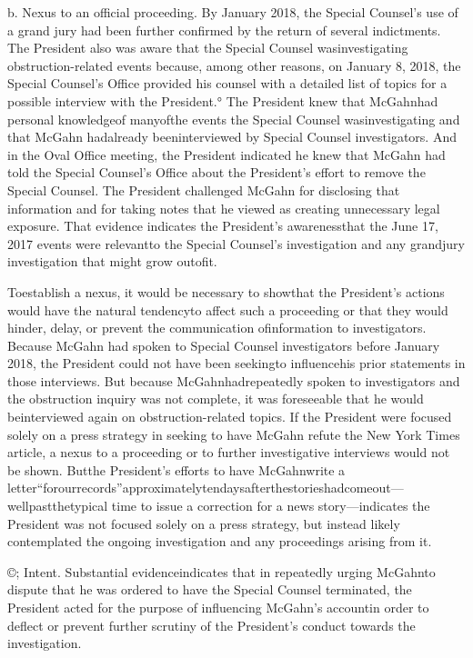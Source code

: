b. Nexus to an official proceeding. By January 2018, the Special Counsel’s use of a grand jury had been further confirmed by the return of several indictments. The President also was aware that the Special Counsel wasinvestigating obstruction-related events because, among other reasons, on January 8, 2018, the Special Counsel’s Office provided his counsel with a detailed list of topics for a possible interview with the President.° The President knew that McGahnhad personal knowledgeof manyofthe events the Special Counsel wasinvestigating and that McGahn hadalready beeninterviewed by Special Counsel investigators. And in the Oval Office meeting, the President indicated he knew that McGahn had told the Special Counsel’s Office about the President’s effort to remove the Special Counsel. The President challenged McGahn for disclosing that information and for taking notes that he viewed as creating unnecessary legal exposure. That evidence indicates the President’s awarenessthat the June 17, 2017 events were relevantto the Special Counsel’s investigation and any grandjury investigation that might grow outofit.

Toestablish a nexus, it would be necessary to showthat the President’s actions would have the natural tendencyto affect such a proceeding or that they would hinder, delay, or prevent the communication ofinformation to investigators. Because McGahn had spoken to Special Counsel investigators before January 2018, the President could not have been seekingto influencehis prior statements in those interviews. But because McGahnhadrepeatedly spoken to investigators and the obstruction inquiry was not complete, it was foreseeable that he would beinterviewed again on obstruction-related topics. If the President were focused solely on a press strategy in seeking to have McGahn refute the New York Times article, a nexus to a proceeding or to further investigative interviews would not be shown. Butthe President’s efforts to have McGahnwrite a letter“forourrecords”approximatelytendaysafterthestorieshadcomeout—wellpastthetypical time to issue a correction for a news story—indicates the President was not focused solely on a press strategy, but instead likely contemplated the ongoing investigation and any proceedings arising from it.

©; Intent. Substantial evidenceindicates that in repeatedly urging McGahnto dispute that he was ordered to have the Special Counsel terminated, the President acted for the purpose of influencing McGahn’s accountin order to deflect or prevent further scrutiny of the President’s conduct towards the investigation.

